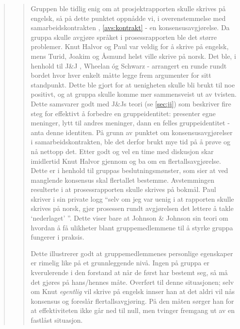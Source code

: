 \begin{quote}
\begin{quote}
Gruppen ble tidlig enig om at prosjektrapporten skulle skrives på engelsk, så på
dette punktet oppnådde vi, i overenstemmelse med samarbeidskontrakten ,
\cref{avs:kontrakt} - en konsensusavgjørelse. Da gruppa skulle avgjøre språket i
prosessrapporten ble det større problemer. Knut Halvor og Paul var veldig for å
skrive på engelsk, mens Turid, Joakim og Åsmund helst ville skrive på norsk. Det
ble, i henhold til J\&J \cite{jj}, Wheelan \cite{wheelan} óg Schwarz
\cite{schwarz} - arrangert en runde rundt bordet hvor hver enkelt måtte legge
frem argumenter for sitt standpunkt. Dette ble gjort for at uenigheten skulle
bli brukt til noe positivt, og at gruppa skulle komme mer sammensveist ut av
tvisten. Dette samsvarer godt med J\&Js teori (se \cref{sec:jj}) som beskriver
fire steg for effektivt å forbedre en gruppeidentitet: presenter egne meninger,
lytt til andres meninger, dann en felles gruppeidentitet - anta denne identiten.
På grunn av punktet om konsensusavgjørelser i samarbeidskontrakten, ble det
derfor brukt mye tid på å prøve og nå nettopp det. Etter godt og vel en time med
diskusjon skar imidlertid Knut Halvor gjennom og ba om en
flertallsavgjørelse. Dette er i henhold til gruppas beslutningsmønster, som sier
at ved manglende konsensus skal flertallet bestemme. Avstemmingen resulterte i
at prosessrapporten skulle skrives på bokmål. Paul skriver i sin private logg ``selv om jeg var uenig i at rapporten skulle
skrives på norsk, gjør prosessen rundt avgjørelsen det lettere å takle
`nederlaget' ''. Dette viser bare at Johnson \& Johnson sin teori \cite{jj} om
hvordan å få ulikheter blant gruppemedlemmene til å styrke gruppa fungerer i
praksis. 

Dette illustrerer godt at gruppemedlemmenes personlige egenskaper er rimelig
like på et grunnleggende nivå. Ingen på gruppa er kverulerende i den forstand at
når de først har bestemt seg, så må det gjøres på hans/hennes måte. Overført til
denne situasjonen; selv om Knut \emph{egentlig} vil skrive på
engelsk innser han at det aldri vil nås konsensus og foreslår
flertallsavgjøring. På den måten sørger han for at effektiviteten ikke går ned
til null, men tvinger fremgang ut av en fastlåst situasjon. 


\end{quote}
\end{quote}
